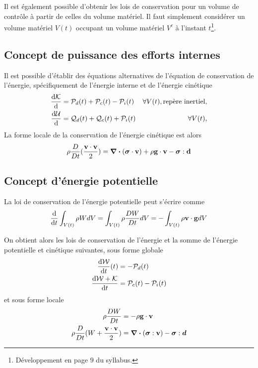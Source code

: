       Il est également possible d'obtenir les lois de conservation pour un volume de contrôle à partir de celles du volume matériel. Il faut simplement considérer un volume matériel $V(t)$ occupant un volume matériel $V^c$ à l'instant $t$\footnote{Développement en page $9$ du syllabus.}.

    \subsection{Concept de puissance des efforts internes}
      Il est possible d'établir des équations alternatives de l'équation de conservation de l'énergie, spécifiquement de l'énergie interne et de l'énergie cinétique
      \begin{equation}\begin{aligned}
        \dv{\mathcal{K}} {}(t) &= \mathcal{P}_d(t) + \mathcal{P}_c(t) - \mathcal{P}_i(t) & \forall V(t), \textrm{repère inertiel},\\
        \dv{\mathcal{U}} {}(t) &= \mathcal{Q}_d(t) + \mathcal{Q}_c(t) + \mathcal{P}_i(t) & \forall V(t),
      \end{aligned}\end{equation}
      La forme locale de la conservation de l'énergie cinétique est alors
      \begin{equation}
        \rho \frac{D }{D t}(\frac{\vb{v}\cdot \vb{v}}{2}) = \div (\boldsymbol{\sigma} \cdot \vb{v}) + \rho \vb{g} \cdot \vb{v} - \boldsymbol{\sigma} : \vb{d}
      \end{equation}

    \subsection{Concept d'énergie potentielle}
      La loi de conservation de l'énergie potentielle peut s'écrire comme
      \begin{equation}
        \dv{t}\int_{V(t)} \rho W dV = \int_{V(t)} \rho \frac{D W}{D t} dV = - \int_{V(t)} \rho \vb{v} \cdot \vb{g} dV
      \end{equation}

      On obtient alors les lois de conservation de l'énergie et la somme de l'énergie potentielle et cinétique suivantes, sous forme globale
      \begin{equation}\begin{aligned}
          \dv{\mathcal{W}}{t} {}(t) &= -\mathcal{P}_d(t)\\
          \dv{\mathcal{W} + \mathcal{K}}{t} &= \mathcal{P}_c(t) - \mathcal{P}_i(t)
      \end{aligned}\end{equation}
      et sous forme locale
      \begin{align}
        \rho \frac{D W}{D t} &= -\rho \vb{g} \cdot \vb{v}\\
        \rho \frac{D }{D t}(W + \frac{\vb{v} \cdot\vb{v}}{2}) &= \div (\boldsymbol{\sigma} : \vb{v}) - \boldsymbol{\sigma} : \boldsymbol{d}\nonumber
      \end{align}

